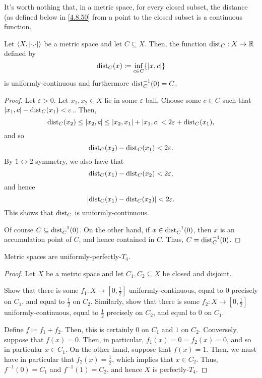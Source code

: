 It's worth nothing that, in a metric space, for every closed subset, the distance (as defined below in \eqref{4.8.50} from a point to the closed subset is a continuous function.
\begin{prp}\label{prp4.8.49}
Let $\coord{X,\metric}$ be a metric space and let $C\subseteq X$.  Then, the function $\operatorname{dist} _C:X\rightarrow \mathbb{R}$ defined by
\begin{equation}\label{4.8.50}
\dist _C(x)\coloneqq \inf _{c\in C}\{ \metric[x][c]\} 
\end{equation}
is uniformly-continuous and furthermore $\operatorname{dist} _C^{-1}(0)=C$.
\begin{proof}
Let $\varepsilon >0$.  Let $x_1,x_2\in X$ lie in some $\varepsilon$ ball.  Choose some $c\in C$ such that $\metric[x_1][c]-\dist_C(x_1)<\varepsilon$..  Then,
\begin{equation}
\dist _C(x_2)\leq \metric[x_2][c]\leq \metric[x_2][x_1]+\metric[x_1][c]<2\varepsilon +\dist _C(x_1),
\end{equation}
and so
\begin{equation}
\operatorname{dist} _C(x_2)-\operatorname{dist} _C(x_1)<2\varepsilon .
\end{equation}
By $1\leftrightarrow 2$ symmetry, we also have that
\begin{equation}
\operatorname{dist} _C(x_1)-\operatorname{dist} _C(x_2)<2\varepsilon ,
\end{equation}
and hence
\begin{equation}
\lvert\operatorname{dist} _C(x_1)-\operatorname{dist} _C(x_2)\rvert<2\varepsilon .
\end{equation}
This shows that $\operatorname{dist} _C$ is uniformly-continuous.

Of course $C\subseteq \operatorname{dist} _C^{-1}(0)$.  On the other hand, if $x\in \operatorname{dist} _C^{-1}(0)$, then $x$ is an accumulation point of $C$, and hence contained in $C$.  Thus, $C=\operatorname{dist} _C^{-1}(0)$.
\end{proof}
\end{prp}
\begin{prp}\label{prp5.4.13}
Metric spaces are uniformly-perfectly-$T_4$.
\begin{proof}
Let $X$ be a metric space and let $C_1,C_2\subseteq X$ be closed and disjoint.
\begin{exr}
Show that there is some $f_1:X\rightarrow [0,\frac{1}{2}]$ uniformly-continuous, equal to $0$ precisely on $C_1$, and equal to $\frac{1}{2}$ on $C_2$.  Similarly, show that there is some $f_2:X\rightarrow [0,\frac{1}{2}]$ uniformly-continuous, equal to $\frac{1}{2}$ precisely on $C_2$, and equal to $0$ on $C_1$.
\end{exr}
Define $f\coloneqq f_1+f_2$.  Then, this is certainly $0$ on $C_1$ and $1$ on $C_2$.  Conversely, suppose that $f(x)=0$.  Then, in particular, $f_1(x)=0=f_2(x)=0$, and so in particular $x\in C_1$.  On the other hand, suppose that $f(x)=1$.  Then, we must have in particular that $f_2(x)=\frac{1}{2}$, which implies that $x\in C_2$.  Thus, $f^{-1}(0)=C_1$ and $f^{-1}(1)=C_2$, and hence $X$ is perfectly-$T_4$.
\end{proof}
\end{prp}

